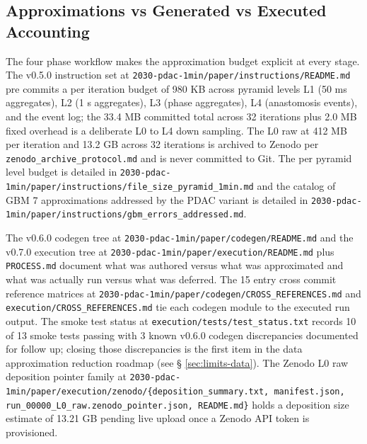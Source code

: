 
\subsection{Approximations vs Generated vs Executed Accounting}
\label{sec:limits-accounting}

The four phase workflow makes the approximation budget explicit
at every stage. The v0.5.0 instruction set at
\texttt{2030-pdac-1min/paper/instructions/README.md} pre commits a
per iteration budget of 980 KB across pyramid levels L1 (50 ms
aggregates), L2 (1 s aggregates), L3 (phase aggregates), L4
(anastomosis events), and the event log; the 33.4 MB committed
total across 32 iterations plus 2.0 MB fixed overhead is a
deliberate L0 to L4 down sampling. The L0 raw at 412 MB per
iteration and 13.2 GB across 32 iterations is archived to Zenodo
per \texttt{zenodo_archive_protocol.md} and is never committed to
Git. The per pyramid level budget is detailed in
\texttt{2030-pdac-1min/paper/instructions/file_size_pyramid_1min.md}
and the catalog of GBM 7 approximations addressed by the PDAC
variant is detailed in
\texttt{2030-pdac-1min/paper/instructions/gbm_errors_addressed.md}.

The v0.6.0 codegen tree at
\texttt{2030-pdac-1min/paper/codegen/README.md} and the v0.7.0
execution tree at
\texttt{2030-pdac-1min/paper/execution/README.md} plus
\texttt{PROCESS.md} document what was authored versus what was
approximated and what was actually run versus what was deferred.
The 15 entry cross commit reference matrices at
\texttt{2030-pdac-1min/paper/codegen/CROSS_REFERENCES.md} and
\texttt{execution/CROSS_REFERENCES.md} tie each codegen module to
the executed run output. The smoke test status at
\texttt{execution/tests/test_status.txt} records 10 of 13 smoke
tests passing with 3 known v0.6.0 codegen discrepancies documented
for follow up; closing those discrepancies is the first item in
the data approximation reduction roadmap (see \S
\ref{sec:limits-data}). The Zenodo L0 raw deposition pointer
family at
\texttt{2030-pdac-1min/paper/execution/zenodo/\{deposition_summary.txt, manifest.json, run_00000_L0_raw.zenodo_pointer.json, README.md\}}
holds a deposition size estimate of 13.21 GB pending live upload
once a Zenodo API token is provisioned.

